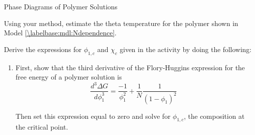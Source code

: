 \begin{activity}{Phase Diagrams of Polymer Solutions}
\begin{ctqs}
	\question Using your method, estimate the theta temperature for the polymer shown in Model \ref{\labelbase:mdl:Ndependence}.
	
		\begin{solution}[0.5in]\end{solution} 

\end{ctqs}



\begin{exercises}

	\exercise Derive the expressions for $\phi_{1,c}$ and $\chi_c$ given in the activity by doing the following:
		\label{\labelbase:exc:critpt}
	
		\begin{enumerate}
	
			\item First, show that the third derivative of the Flory-Huggins expression for the free energy of a polymer solution is
				\begin{equation*}
					\frac{d^3\Delta G}{d\phi_1^3} = \frac{-1}{\phi_1^2} + \frac{1}{N}\frac{1}{(1-\phi_1)^2}
				\end{equation*}
		
				Then set this expression equal to zero and solve for $\phi_{1,c}$, the composition at the critical point.
			

\end{enumerate}
\end{exercises}
\end{activity}
